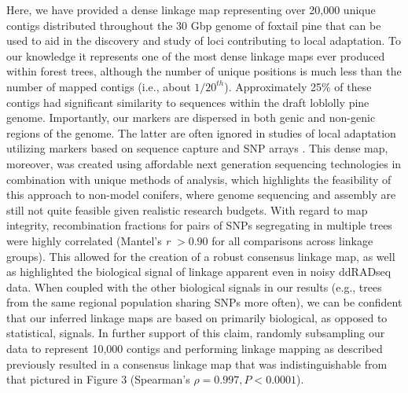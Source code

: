 \documentclass[smallextended]{svjour3}
\begin{document}
Here, we have provided a dense linkage map representing over 20,000 unique contigs
distributed throughout the 30 Gbp genome of foxtail pine that can be used to aid in 
the discovery and study of loci contributing to local adaptation. To our knowledge it represents one of the most dense 
linkage maps ever produced within forest trees, although the number of unique positions is much less than the number 
of mapped contigs (i.e., about $1/20^{th}$). Approximately 25\% of these contigs had significant similarity to sequences within 
the draft loblolly pine genome. Importantly, our markers are dispersed in both genic and
non-genic regions of the genome. The latter are often ignored in studies of local adaptation utilizing markers based on 
sequence capture \citep[e.g.,][]{Neves:2014} and SNP arrays \citep[e.g.,][]{Eckert:2010a}. This dense map, moreover,
was created using affordable next generation sequencing technologies in combination with unique methods 
of analysis, which highlights the feasibility of this approach to non-model conifers, where genome sequencing and 
assembly are still not quite feasible given realistic research budgets. 
With regard to map integrity, recombination fractions for pairs of SNPs
segregating in multiple trees were highly correlated (Mantel's \textit{r} $> 0.90$ for all comparisons across linkage groups). 
This allowed for the creation of a robust consensus linkage map, as well as highlighted the biological signal of 
linkage apparent even in noisy ddRADseq data. When coupled with the other 
biological signals in our results (e.g., trees from the same regional population sharing SNPs more often), we can be 
confident that our inferred linkage maps are based
on primarily biological, as opposed to statistical, signals. In further support of this claim, randomly subsampling our data to 
represent 10,000 contigs and performing linkage mapping
as described previously resulted in a consensus linkage map that was indistinguishable
from that pictured in Figure $3$ (Spearman's $\rho = 0.997, P < 0.0001$).  
\end{document}
